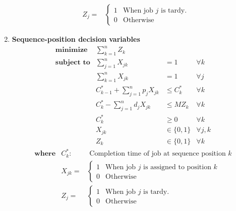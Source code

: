\documentclass[a4paper, fleqn]{article}
\begin{document}
\begin{enumerate}[label=(\alph{*})]
$$\begin{array}{lrl}
&Z_{j}=&\left\{\begin{array}{ll}1&\text{When job }j\text{ is tardy.}\\0&\text{Otherwise}
\end{array}\right.
\end{array}
$$
\item \textbf{Sequence-position decision variables}
$$
\begin{array}{crll}
\textbf{minimize}&\sum_{k=1}^nZ_k\\
\textbf{subject to}&\sum_{j=1}^nX_{jk}&=1&\forall k\\
&\sum_{k=1}^nX_{jk}&=1&\forall j\\
&C_{k-1}^*+\sum_{j=1}^np_jX_{jk}&\leq C_k^*&\forall k\\
&C_k^*-\sum_{j=1}^nd_jX_{jk}&\leq MZ_k&\forall k\\
&C_k^*&\geq0&\forall k\\
&X_{jk}&\in\{0,1\}&\forall j,k\\
&Z_k&\in\{0,1\}&\forall k
\end{array}
$$
$$
\begin{array}{lrl}
\textbf{where}&C_k^*:&\text{ Completion time of job at sequence position }k\\&X_{jk}=&\left\{\begin{array}{ll}1&\text{When job }j\text{ is assigned to position }k\\0&\text{Otherwise}\end{array}\right.\\
&Z_{j}=&\left\{\begin{array}{ll}1&\text{When job }j\text{ is tardy.}\\0&\text{Otherwise}
\end{array}\right.
\end{array}
$$
\end{enumerate}
\end{document}
